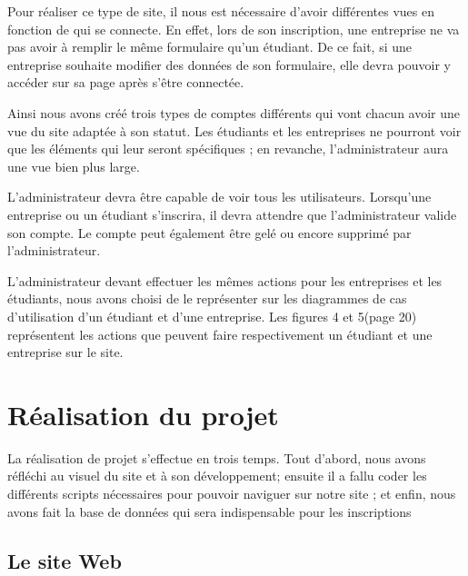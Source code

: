\documentclass[12pt,a4paper]{article}
\begin{document}
\begin{large}
\begin{onehalfspace}    Pour réaliser ce type de site, il nous est nécessaire d’avoir différentes vues en fonction de qui se connecte. En effet, lors de son inscription, une entreprise ne va pas avoir à remplir le même formulaire qu’un étudiant. De ce fait, si une entreprise souhaite modifier des données de son formulaire, elle devra pouvoir y accéder sur sa page après s’être connectée.

    Ainsi nous avons créé trois types de comptes différents qui vont chacun avoir une vue du site adaptée à son statut. Les étudiants et les entreprises ne pourront voir que les éléments qui leur seront spécifiques ; en revanche, l’administrateur aura une vue bien plus large.

    L’administrateur devra être capable de voir tous les utilisateurs. Lorsqu’une entreprise ou un étudiant s’inscrira, il devra attendre que l’administrateur valide son compte. Le compte peut également être gelé ou encore supprimé par l’administrateur.

    L’administrateur devant effectuer les mêmes actions pour les entreprises et les étudiants, nous avons choisi de le représenter sur les diagrammes de cas d’utilisation d’un étudiant et d’une entreprise. Les figures 4 et 5(page 20) représentent les actions que peuvent faire respectivement un étudiant et une entreprise sur le site.
\end{onehalfspace}
\end{large}
\newpage
\section{Réalisation du projet}

\begin{large}
\begin{onehalfspace}    La réalisation de projet s’effectue en trois temps. Tout d’abord, nous avons réfléchi au visuel du site et à son développement; ensuite il a fallu coder les différents scripts nécessaires pour pouvoir naviguer sur notre site ; et enfin, nous avons fait la base de données qui sera indispensable pour les inscriptions
\end{onehalfspace}
\end{large}

\subsection{Le site Web}
\end{document}
